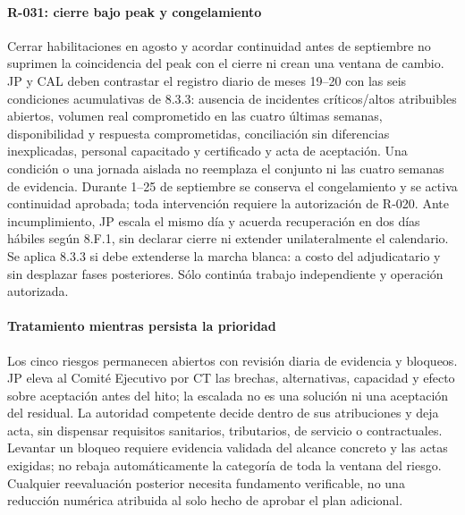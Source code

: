 \paragraph{R-031: cierre bajo peak y congelamiento}
Cerrar habilitaciones en agosto y acordar continuidad antes de septiembre no
suprimen la coincidencia del peak con el cierre ni crean una ventana de cambio.
JP y CAL deben contrastar el registro diario de meses 19--20 con las seis
condiciones acumulativas de 8.3.3: ausencia de incidentes críticos/altos atribuibles
abiertos, volumen real comprometido en las cuatro últimas semanas, disponibilidad
y respuesta comprometidas, conciliación sin diferencias inexplicadas, personal
capacitado y certificado y acta de aceptación. Una condición o una jornada aislada
no reemplaza el conjunto ni las cuatro semanas de evidencia.
Durante 1--25 de septiembre se conserva el congelamiento y se activa continuidad
aprobada; toda intervención requiere la autorización de R-020. Ante incumplimiento,
JP escala el mismo día y acuerda recuperación en dos días hábiles según 8.F.1,
sin declarar cierre ni extender unilateralmente el calendario. Se aplica 8.3.3
si debe extenderse la marcha blanca: a costo del adjudicatario y sin desplazar
fases posteriores. Sólo continúa trabajo independiente y operación autorizada.

\paragraph{Tratamiento mientras persista la prioridad}
Los cinco riesgos permanecen abiertos con revisión diaria de evidencia y bloqueos.
JP eleva al Comité Ejecutivo por CT las brechas, alternativas, capacidad y efecto
sobre aceptación antes del hito; la escalada no es una solución ni una aceptación
del residual. La autoridad competente decide dentro de sus atribuciones y deja
acta, sin dispensar requisitos sanitarios, tributarios, de servicio o contractuales.
Levantar un bloqueo requiere evidencia validada del alcance concreto y las actas
exigidas; no rebaja automáticamente la categoría de toda la ventana del riesgo.
Cualquier reevaluación posterior necesita fundamento verificable, no una reducción
numérica atribuida al solo hecho de aprobar el plan adicional.

